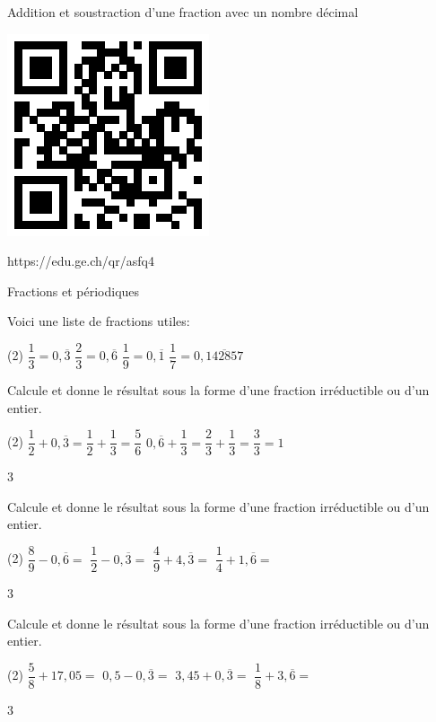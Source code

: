 \documentclass[a4paper,11pt]{report}
\begin{document}
\begin{qmun}{Addition et soustraction d'une fraction avec un nombre décimal
	}{
		\begin{center}
\includegraphics[scale=1]{media/qr/asfq4}

\tiny{{https://edu.ge.ch/qr/asfq4}}
		\end{center}
	}
\end{qmun}

\begin{resolu}{Fractions et périodiques}{Voici une liste de fractions utiles:
		\begin{tasks}(2)
    \task $\dfrac{1}{3}=0,\overline{3} $
    \task $\dfrac{2}{3}=0,\overline{6} $
    \task $\dfrac{1}{9}=0,\overline{1}$
    \task $\dfrac{1}{7}=0,\overline{142857}$
\end{tasks}

Calcule et donne le résultat sous la forme d'une fraction irréductible ou d'un entier. 

\begin{tasks}(2)
    \task $\dfrac{1}{2}+0,\overline{3}=\dfrac{1}{2}+ \dfrac{1}{3}=\dfrac{5}{6}$
   \task $0,\overline{6}+\dfrac{1}{3}=\dfrac{2}{3}+\dfrac{1}{3}=\dfrac{3}{3}=1$
\end{tasks}}
{3}
\end{resolu}

\vfill

\begin{exo}
{Calcule et donne le résultat sous la forme d'une fraction irréductible ou d'un entier.

	\begin{tasks}(2)
\task $\dfrac{8}{9}-0,\overline{6}=$
\task$\dfrac{1}{2}-0,\overline{3}=$
\task $\dfrac{4}{9}+4,\overline{3}=$
\task $\dfrac{1}{4}+1,\overline{6}=$
\end{tasks}}
{3}
\end{exo}

\vfill

\begin{exo}
 {Calcule et donne le résultat sous la forme d'une fraction irréductible ou d'un entier.

	 \begin{tasks}(2)
\task $\dfrac{5}{8}+17,05=$
\task$0,5-0,\overline{3}=$
\task $ 3,45+0,\overline{3}=$
\task $\dfrac{1}{8}+3,\overline{6}=$
\end{tasks}
}
{3}
\end{exo}
\end{document}
